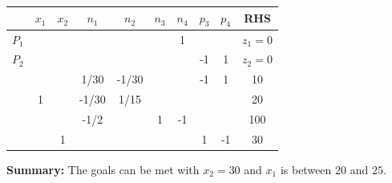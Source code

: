 \documentclass[answers]{exam}
\begin{document}
\begin{questions}
\begin{solution}
\begin{parts}
		\begin{tabular}{cccccccccc}
			& $x_1$ & $x_2$ & $n_1$ & $n_2$ & $n_3$ & $n_4$ & $p_3$ & $p_4$ & RHS     \\ \hline
			$P_1$ &       &       &       &       &       & 1     &       &       & $z_1=0$ \\
			$P_2$ &       &       &       &       &       &       & -1    & 1     & $z_2=0$ \\ \hline
			&       &       & 1/30  & -1/30 &       &       & -1    & 1     & 10      \\
			& 1     &       & -1/30 & 1/15  &       &       &       &       & 20      \\
			&       &       & -1/2  &       & 1     & -1    &       &       & 100     \\
			&       & 1     &       &       &       &       & 1     & -1    & 30     
		\end{tabular}
	
		\textbf{Summary: } The goals can be met with $x_2=30$ and $x_1$ is between $20$ and $25$.
	\end{parts}
\end{solution}

\end{questions}
\end{document}
